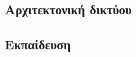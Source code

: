\documentclass[../main.tex]{subfiles}
\begin{document}
\subsection{Αρχιτεκτονική δικτύου}

\subsection{Εκπαίδευση}
\end{document}
